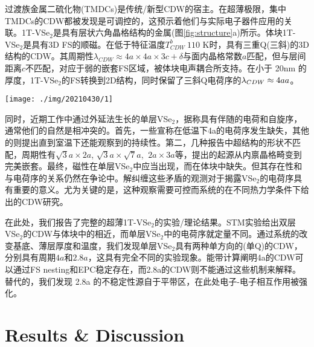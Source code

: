\documentclass[reprint, aps, prb, showkeys]{revtex4-2}
\begin{document}
过渡族金属二硫化物(TMDCs)是传统/新型CDW的宿主。在超薄极限，集中TMDCs的CDW都被发现是可调控的，这预示着他们与实际电子器件应用的关联。1T-VSe$_2$是具有层状六角晶格结构的金属(图\ref{fig:structure}a)所示。体块1T-VSe$_2$是具有3D FS的顺磁。在低于特征温度$T_{CDW}^b ~ 110$ K时，具有三重Q(三斜)的3D结构的CDW。其周期性$\lambda_{CDW} \approx 4a \times 4a \times 3c + \delta$与面内晶格常数$a$匹配，但与层间距离$c$不匹配，对应于弱的嵌套FS区域，被体块电声耦合所支持。在小于 20nm 的厚度，1T-VSe$_2$的FS转换到2D结构，同时保留了三斜Q电荷序的$\lambda_{CDW} \approx 4a \time 4a$。
\begin{figure*}[t]
    \texttt{[image: ./img/20210430/1]}
    \caption{\label{fig:structure} 
    VSe$_2$的晶格结构与STM图像。(a)生长在石墨基底上的1T-VSe$_2$的原子结构；(b)STM大面积图样，内图给出了层间的高度曲线；(c-d)原子层分辨率在78K时的STM形貌图，每种形貌都给出了清晰的可分辨六角超结构。
    }
\end{figure*}

同时，近期工作中通过外延法生长的单层VSe$_2$，据称具有伴随的电荷和自旋序，通常他们的自然是相冲突的。首先，一些宣称在低温下4a的电荷序发生缺失，其他的则提出直到室温下还能观察到的持续性。第二，几种报告中超结构的形状不匹配，周期性有$\sqrt{3}a \times 2a$, $\sqrt{3}a \times \sqrt{7}a$, $~ 2a \times 3a$等，提出的起源从内禀晶格畸变到完美嵌套。最终，磁性在单层VSe$_2$中应当出现，而在体块中缺失。但其存在性和与电荷序的关系仍然在争论中。解纠缠这些矛盾的观测对于揭露VSe$_2$的电荷序具有重要的意义。尤为关键的是，这种观察需要可控而系统的在不同热力学条件下给出的CDW研究。

在此处，我们报告了完整的超薄1T-VSe$_2$的实验/理论结果。STM实验给出双层VSe$_2$的CDW与体块中的相近，而单层VSe$_2$中的电荷序就定量不同。通过系统的改变基底、薄层厚度和温度，我们发现单层VSe$_2$具有两种单方向的(单Q)的CDW，分别具有周期$4a$和$2.8a$，这具有完全不同的实验现象。能带计算阐明4a的CDW可以通过FS nesting和EPC稳定存在，而2.8a的CDW则不能通过这些机制来解释。替代的，我们发现 2.8a 的不稳定性源自于平带区，在此处电子-电子相互作用被强化。

\section{Results \& Discussion}
\end{document}
